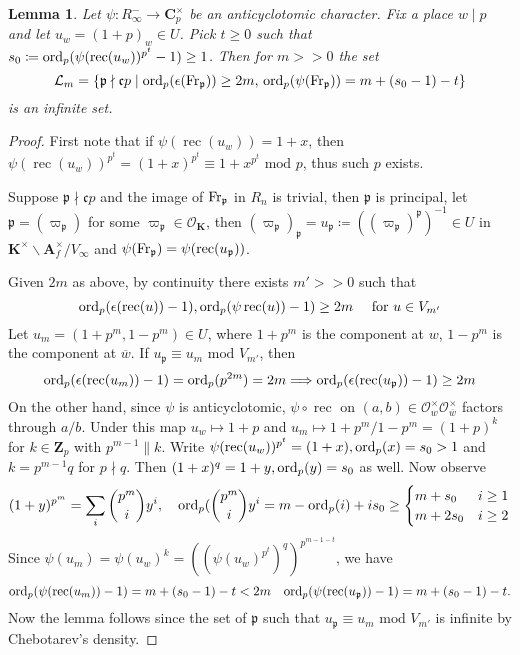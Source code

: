 \documentclass[leqno]{amsart}
\newcommand{\bw}{\overline{w}}
\newcommand{\Fr}{\textnormal{Fr}} %
\DeclareMathOperator{\rec}{rec}
\newcommand{\ord}{\textnormal{ord}}
\newcommand{\Zp}{\mathbf{Z}_p}
\newcommand{\C}{\mathbf C}
\newcommand{\A}{\mathbf A}
\newcommand{\K}{{\mathbf{K}}} %
\newcommand{\oo}{\mathcal{O}} %
\newcommand{\fc}{\mathfrak{c}}
\newcommand{\fp}{\mathfrak{p}}
\newtheorem{lem}[thm]{Lemma}
\theoremstyle{definition}
\theoremstyle{remark}
\begin{document}
\begin{lem}
Let $\psi\colon R_\infty^-\to \C_p^\times$
be an anticyclotomic character.
Fix a place $w\mid p$
and let  $u_w=(1+p)_w\in U$. 
Pick $t\geq 0$ such that
$s_0\coloneqq \ord_p(\psi(\rec(u_w))^{p^t}-1)\geq 1$.
Then for $m>>0$ the set 
\[
	\mathcal{L}_m=\{\fp\nmid \fc p\mid
	\ord_p(\epsilon(\Fr_\fp))\geq 2m,\,
\ord_p(\psi(\Fr_\fp))=m+(s_0-1)-t\}
\]
is an infinite set.
\end{lem}
\begin{proof}
First note that if $\psi(\rec(u_w))=1+x$,
then  $\psi(\rec(u_w))^{p^t}=(1+x)^{p^t}\equiv 
1+x^{p^t}\text{ mod }p$, thus such $p$ exists.

Suppose $\fp\nmid \fc p$
and the image of  $\Fr_\fp$ in  $R_n$ is trivial,
then  $\fp$ is principal,
let $\fp=(\varpi_\fp)$ for some  $\varpi_\fp\in \oo_\K$,
then  $(\varpi_\fp)_{\fp}=u_\fp\coloneqq ((\varpi_\fp)^{\fp})^{-1}\in U$ in $\K^\times\backslash \A_f^\times/V_\infty$
and  $\psi(\Fr_\fp)=\psi(\rec(u_\fp))$.

Given  $2m$ as above, by continuity there exists
$m'>>0$ such that 
\[
	\ord_p(\epsilon(\rec(u))-1),
	\ord_p(\psi\rec(u))-1)\geq 2m\quad
	\text{ for } u\in V_{m'}
\]
Let $u_m=(1+p^m, 1-p^m)\in U$,
where  $1+p^m$ is the component at  $w$,
$1-p^m$ is the component at  $\bw$.
If $u_\fp\equiv u_m\text{ mod }V_{m'}$, then
\[
\ord_p(\epsilon(\rec(u_m))-1)=\ord_p(p^{2m})=2m\Longrightarrow
\ord_p(\epsilon(\rec(u_\fp))-1)\geq 2m
\]
On the other hand,
since $\psi$ is anticyclotomic,
$\psi\circ \rec$ on  $(a,b)\in\oo_w^\times\oo_{\bw}^\times$
factors through $a/b$.
Under this map  $u_w\mapsto 1+p$
and  $u_m\mapsto 1+p^m/1-p^m=(1+p)^k$
for $k\in \Zp$ with $p^{m-1}\parallel k$. 
Write $\psi(\rec(u_w))^{p^t}=(1+x), \ord_p(x)=s_0>1$
and  $k=p^{m-1}q$ for $p\nmid q$.
Then $(1+x)^q=1+y,\ord_p(y)=s_0$ as well.
Now observe 
\[
	(1+y)^{p^{m}}=\sum_i \binom{p^m}{i}y^i,\quad
	\ord_p(\binom{p^m}{i}y^i=m-\ord_p(i)+is_0\geq
	\begin{cases}
		m+s_0& i\geq 1\\
		m+2s_0 & i\geq 2
	\end{cases}
\]
Since 
$\psi(u_m)=\psi(u_w)^k=((\psi(u_w)^{p^t})^q)^{p^{m-1-t}}$,
we have
\[
\ord_p(\psi(\rec(u_m))-1)=m+(s_0-1)-t<2m\quad
\ord_p(\psi(\rec(u_\fp))-1)=m+(s_0-1)-t.
\]
Now the lemma follows since 
the set of $\fp$ 
such that  $u_\fp\equiv u_m\text{ mod }V_{m'}$
is infinite by Chebotarev's density.
\end{proof}
\end{document}
